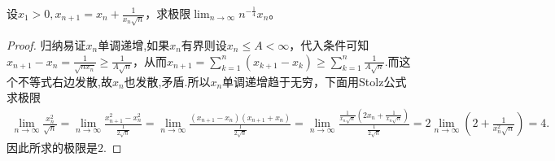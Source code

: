 \documentclass[../../main.tex]{subfiles}
\begin{document}
\begin{example}\label{example4.47231}
设\(x_1 > 0,x_{n + 1}=x_n+\frac{1}{x_n\sqrt{n}}\)，求极限\(\lim_{n\rightarrow\infty}n^{-\frac{1}{4}}x_n\)。
\end{example}
\begin{proof}
归纳易证\(x_n\)单调递增,如果\(x_n\)有界则设\(x_n\leqslant  A<\infty\)，代入条件可知\(x_{n + 1}-x_n=\frac{1}{\sqrt{nx_n}}\geqslant \frac{1}{A\sqrt{n}}\)，从而$x_{n+1}=\sum_{k=1}^n{\left( x_{k+1}-x_k \right)}\geqslant \sum_{k=1}^n{\frac{1}{A\sqrt{n}}}$.而这个不等式右边发散,故$x_n$也发散,矛盾.所以\(x_n\)单调递增趋于无穷，下面用Stolz公式求极限
\begin{align*}
\lim_{n\rightarrow \infty} \frac{x_{n}^{2}}{\sqrt{n}}=\lim_{n\rightarrow \infty} \frac{x_{n+1}^{2}-x_{n}^{2}}{\frac{1}{2\sqrt{n}}}=\lim_{n\rightarrow \infty} \frac{\left( x_{n+1}-x_n \right) \left( x_{n+1}+x_n \right)}{\frac{1}{2\sqrt{n}}}=\lim_{n\rightarrow \infty} \frac{\frac{1}{x_n\sqrt{n}}\left( 2x_n+\frac{1}{x_n\sqrt{n}} \right)}{\frac{1}{2\sqrt{n}}}=2\lim_{n\rightarrow \infty} \left( 2+\frac{1}{x_{n}^{2}\sqrt{n}} \right) =4.
\end{align*}
因此所求的极限是\(2\).

\end{proof}
\end{document}
